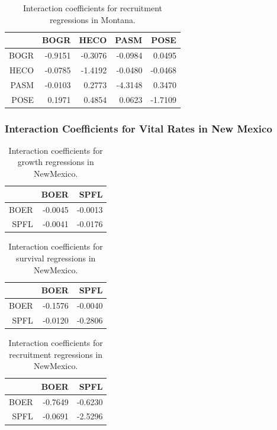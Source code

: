 \documentclass[12pt,]{article}
\begin{document}
\begin{table}[ht]
\centering
\caption{Interaction coefficients for recruitment regressions in Montana.} 
\begin{tabular}{rrrrr}
  \hline
 & BOGR & HECO & PASM & POSE \\ 
  \hline
BOGR & -0.9151 & -0.3076 & -0.0984 & 0.0495 \\ 
  HECO & -0.0785 & -1.4192 & -0.0480 & -0.0468 \\ 
  PASM & -0.0103 & 0.2773 & -4.3148 & 0.3470 \\ 
  POSE & 0.1971 & 0.4854 & 0.0623 & -1.7109 \\ 
   \hline
\end{tabular}
\end{table}



\newpage{}

\subsubsection{Interaction Coefficients for Vital Rates in New Mexico}

\begin{table}[ht]
\centering
\caption{Interaction coefficients for growth regressions in NewMexico.} 
\begin{tabular}{rrr}
  \hline
 & BOER & SPFL \\ 
  \hline
BOER & -0.0045 & -0.0013 \\ 
  SPFL & -0.0041 & -0.0176 \\ 
   \hline
\end{tabular}
\end{table}

\begin{table}[ht]
\centering
\caption{Interaction coefficients for survival regressions in NewMexico.} 
\begin{tabular}{rrr}
  \hline
 & BOER & SPFL \\ 
  \hline
BOER & -0.1576 & -0.0040 \\ 
  SPFL & -0.0120 & -0.2806 \\ 
   \hline
\end{tabular}
\end{table}

\begin{table}[ht]
\centering
\caption{Interaction coefficients for recruitment regressions in NewMexico.} 
\begin{tabular}{rrr}
  \hline
 & BOER & SPFL \\ 
  \hline
BOER & -0.7649 & -0.6230 \\ 
  SPFL & -0.0691 & -2.5296 \\ 
   \hline
\end{tabular}
\end{table}
\end{document}
